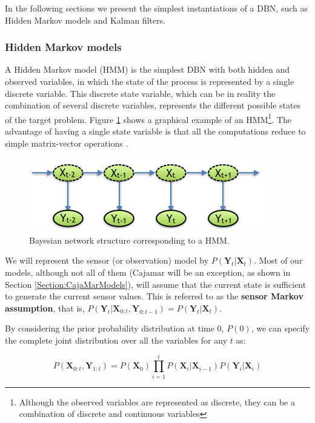 In the following sections we present the simplest instantiations of a DBN, such as Hidden Markov models and Kalman filters.

\subsubsection*{Hidden Markov models}
A Hidden Markov model (HMM) is the simplest DBN with both hidden and observed variables, in which the state of the process is represented by a single discrete variable. This discrete state variable, which can be in reality the combination of several discrete variables, represents the different possible states of the target problem. Figure \ref{Figure:HMM} shows a graphical example of an HMM\footnote{Although the observed variables are represented as discrete, they can be a combination of discrete and continuous variables}. The advantage of having a single state variable is that all the computations reduce to simple matrix-vector operations .

\begin{figure}
\begin{center}
\includegraphics[scale=0.56]{./figures/PreliminariesHMM}
\caption{\label{Figure:HMM}Bayesian network structure corresponding to a HMM.}
\end{center}
\end{figure}

We will represent the sensor (or observation) model by $P(\bm Y_t|\bm X_t)$. Most of our models, although not all of them (Cajamar will be an exception, as shown in Section \ref{Section:CajaMarModels}), will assume that the current state is sufficient to generate the current sensor values. This is referred to as the \textbf{sensor Markov assumption}, that is, $P(\bm Y_t|\bm X_{0:t}, \bm Y_{0:t-1}) = P(\bm Y_t|\bm X_t)$.

By considering the prior probability distribution at time $0$, $P(0)$, we can specify the complete joint distribution over all the variables for any $t$ as:

\begin{equation}
P(\bm X_{0:t},\bm Y_{1:t}) = P(\bm X_0) \prod_{i=1}^t{P(\bm X_i| \bm X_{i-1})P(\bm Y_i|\bm X_i)}
\end{equation}

